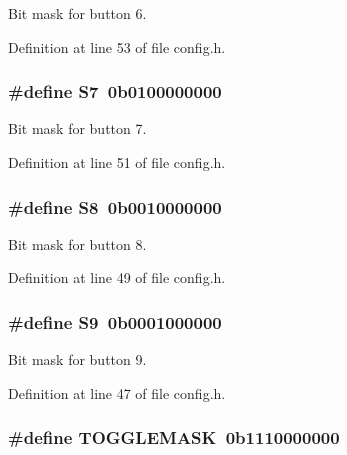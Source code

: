 Bit mask for button 6. 



Definition at line 53 of file config.\+h.

\subsubsection[{\texorpdfstring{S7}{S7}}]{\setlength{\rightskip}{0pt plus 5cm}\#define S7~0b0100000000}\hypertarget{group__buttons_ga6580eeddd36d0d97cdde6f6a4695ed12}{}\label{group__buttons_ga6580eeddd36d0d97cdde6f6a4695ed12}


Bit mask for button 7. 



Definition at line 51 of file config.\+h.

\subsubsection[{\texorpdfstring{S8}{S8}}]{\setlength{\rightskip}{0pt plus 5cm}\#define S8~0b0010000000}\hypertarget{group__buttons_ga4516955061f24ae7162de20aff005c9b}{}\label{group__buttons_ga4516955061f24ae7162de20aff005c9b}


Bit mask for button 8. 



Definition at line 49 of file config.\+h.

\subsubsection[{\texorpdfstring{S9}{S9}}]{\setlength{\rightskip}{0pt plus 5cm}\#define S9~0b0001000000}\hypertarget{group__buttons_ga6eef6bdffd8bac54d6b4be0176dd20ff}{}\label{group__buttons_ga6eef6bdffd8bac54d6b4be0176dd20ff}


Bit mask for button 9. 



Definition at line 47 of file config.\+h.

\subsubsection[{\texorpdfstring{T\+O\+G\+G\+L\+E\+M\+A\+SK}{TOGGLEMASK}}]{\setlength{\rightskip}{0pt plus 5cm}\#define T\+O\+G\+G\+L\+E\+M\+A\+SK~0b1110000000}\hypertarget{group__buttons_ga77a6549a849f9a9472a367e4148289b7}{}\label{group__buttons_ga77a6549a849f9a9472a367e4148289b7}


